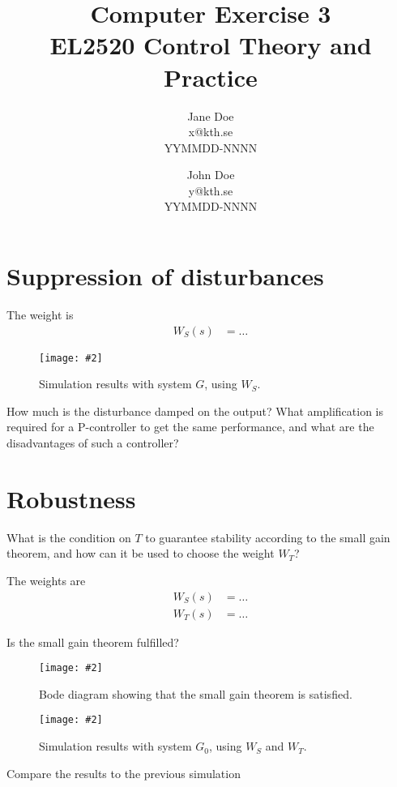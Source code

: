 \documentclass[a4paper,11pt]{article}
\title{
	Computer Exercise 3\\
	EL2520 Control Theory and Practice
}
\author{
	Jane Doe\\
	x@kth.se\\
	YYMMDD-NNNN
	\and
	John Doe\\
	y@kth.se\\
	YYMMDD-NNNN
}
\newcommand{\image}[3][width=1.0\columnwidth]{
	\begin{figure}[h!]
		\centering
	    \texttt{[image: \#2]}
		\caption{#3}
		\label{fig:#2}
	\end{figure}
}
\begin{document}
	\maketitle

	\section*{Suppression of disturbances}

	The weight is
	\begin{align*}
		W_S(s) &= \ldots
	\end{align*}

	\image{figure_1.pdf}{Simulation results with system $G$, using $W_S$.}

	How much is the disturbance damped on the output?
	What amplification is required for a P-controller to get the same performance, and what are the disadvantages of such a controller?
	\par\dotfill\par\dotfill\par

	\section*{Robustness}
	What is the condition on $T$ to guarantee stability according to the small gain theorem, and how can it be used to choose the weight $W_T$?
	\par\dotfill\par\dotfill\par

	The weights are
	\begin{align*}
		W_S(s) &= \ldots\\
		W_T(s) &= \ldots
	\end{align*}

	Is the small gain theorem fulfilled?
	\par\dotfill\par\dotfill\par

	\image{figure_2.pdf}{Bode diagram showing that the small gain theorem is satisfied.}

	\image{figure_3.pdf}{Simulation results with system $G_0$, using $W_S$ and $W_T$.}

	Compare the results to the previous simulation
	\par\dotfill\par\dotfill\par
\end{document}
